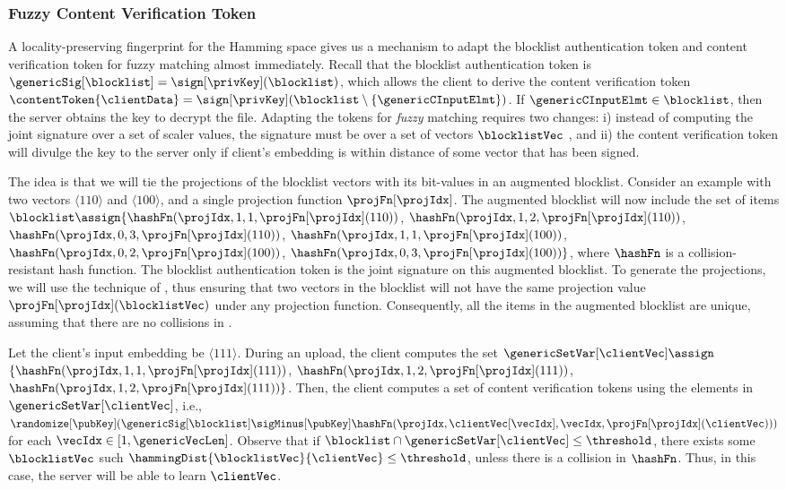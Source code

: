 \subsubsection{Fuzzy Content Verification Token}
\label{sec:fm:no_pre}
%
A locality-preserving fingerprint for the Hamming space gives us a mechanism to adapt the blocklist authentication token and content verification token for fuzzy matching almost immediately. Recall that the blocklist authentication token is $\genericSig[\blocklist] = \sign[\privKey](\blocklist)$, which allows the client to derive the content verification token $\contentToken{\clientData} = \sign[\privKey](\blocklist \setminus \{\genericCInputElmt\})$. If $\genericCInputElmt \in \blocklist$, then the server obtains the key to decrypt the file. Adapting the tokens for \emph{fuzzy} matching requires two changes: i) instead of computing the joint signature over a set of scaler values, the signature must be over a set of vectors $\blocklistVec$ , and ii) the content verification token will divulge the key to the server only if  client's embedding is within distance \threshold of some vector that has been signed. 



The idea is that we will tie the projections of the blocklist vectors with its bit-values in an augmented blocklist. Consider an example with two vectors $\langle 110 \rangle$ and $\langle 100 \rangle$, and a single projection function $\projFn[\projIdx]$. 
The augmented blocklist will now include the set of items $\blocklist \assign \{\hashFn(\projIdx, 1, 1, \projFn[\projIdx](110))$,
$\hashFn(\projIdx, 1, 2, \projFn[\projIdx](110))$,
$\hashFn(\projIdx, 0, 3,  \projFn[\projIdx](110))$,
$\hashFn(\projIdx, 1, 1, \projFn[\projIdx](100))$,
$\hashFn(\projIdx, 0, 2,  \projFn[\projIdx](100))$, 
$\hashFn(\projIdx, 0, 3, \projFn[\projIdx](100))\}$, where $\hashFn$ is a collision-resistant hash function. 
The blocklist authentication token is the joint signature on this augmented blocklist. To generate the projections, we will use the technique of \citet{chongchitmate2024approximate}, thus ensuring that two vectors in the blocklist will not have the same projection value $\projFn[\projIdx](\blocklistVec)$ under any projection function. Consequently, all the items in the augmented blocklist are unique, assuming that there are no collisions in \hashFn. 

Let the client's input embedding be $\langle 111 \rangle$. During an upload, the client computes the set  $\genericSetVar[\clientVec] \assign$ $\{\hashFn(\projIdx, 1, 1, 
\projFn[\projIdx](111))$, $\hashFn(\projIdx, 1, 2, 
\projFn[\projIdx](111))$, $\hashFn(\projIdx, 1, 2, 
\projFn[\projIdx](111))\}$. Then, the client computes a set of content verification tokens using the elements   
in $\genericSetVar[\clientVec]$, i.e.,  $\randomize[\pubKey](\genericSig[\blocklist] \sigMinus[\pubKey] \hashFn(\projIdx, \clientVec[\vecIdx], \vecIdx, \projFn[\projIdx](\clientVec)))$ for each $\vecIdx \in [1, \genericVecLen]$. Observe that if $\blocklist \cap \genericSetVar[\clientVec] \le \threshold$, there exists some $\blocklistVec$ such $\hammingDist{\blocklistVec}{\clientVec} \le \threshold$, unless there is a collision in $\hashFn$. Thus, in this case, the server will be able to learn $\clientVec$. 

